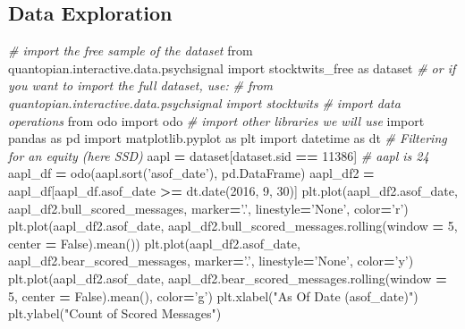 \documentclass[11,]{article}
\newenvironment{Shaded}{\begin{snugshade}}{\end{snugshade}}
\newcommand{\CommentTok}[1]{\textcolor[rgb]{0.56,0.35,0.01}{\textit{#1}}}
\newcommand{\DecValTok}[1]{\textcolor[rgb]{0.00,0.00,0.81}{#1}}
\newcommand{\ImportTok}[1]{#1}
\newcommand{\NormalTok}[1]{#1}
\newcommand{\OperatorTok}[1]{\textcolor[rgb]{0.81,0.36,0.00}{\textbf{#1}}}
\newcommand{\StringTok}[1]{\textcolor[rgb]{0.31,0.60,0.02}{#1}}
\newcommand{\VariableTok}[1]{\textcolor[rgb]{0.00,0.00,0.00}{#1}}
\begin{document}
\hypertarget{data-exploration}{%
\subsection{Data Exploration}\label{data-exploration}}

\begin{Shaded}
\begin{Highlighting}[]
\CommentTok{# import the free sample of the dataset}
\ImportTok{from}\NormalTok{ quantopian.interactive.data.psychsignal }\ImportTok{import}\NormalTok{ stocktwits_free  }\ImportTok{as}\NormalTok{ dataset}
\CommentTok{# or if you want to import the full dataset, use:}
\CommentTok{# from quantopian.interactive.data.psychsignal import stocktwits}
\CommentTok{# import data operations}
\ImportTok{from}\NormalTok{ odo }\ImportTok{import}\NormalTok{ odo}
\CommentTok{# import other libraries we will use}
\ImportTok{import}\NormalTok{ pandas }\ImportTok{as}\NormalTok{ pd}
\ImportTok{import}\NormalTok{ matplotlib.pyplot }\ImportTok{as}\NormalTok{ plt}
\ImportTok{import}\NormalTok{ datetime }\ImportTok{as}\NormalTok{ dt}
\CommentTok{# Filtering for an equity (here SSD)}
\NormalTok{aapl }\OperatorTok{=}\NormalTok{ dataset[dataset.sid }\OperatorTok{==} \DecValTok{11386}\NormalTok{] }\CommentTok{# aapl is 24}
\NormalTok{aapl_df }\OperatorTok{=}\NormalTok{ odo(aapl.sort(}\StringTok{'asof_date'}\NormalTok{), pd.DataFrame)}
\NormalTok{aapl_df2 }\OperatorTok{=}\NormalTok{ aapl_df[aapl_df.asof_date }\OperatorTok{>=}\NormalTok{ dt.date(}\DecValTok{2016}\NormalTok{, }\DecValTok{9}\NormalTok{, }\DecValTok{30}\NormalTok{)]}
\NormalTok{plt.plot(aapl_df2.asof_date, aapl_df2.bull_scored_messages, marker}\OperatorTok{=}\StringTok{'.'}\NormalTok{, linestyle}\OperatorTok{=}\StringTok{'None'}\NormalTok{, color}\OperatorTok{=}\StringTok{'r'}\NormalTok{)}
\NormalTok{plt.plot(aapl_df2.asof_date, aapl_df2.bull_scored_messages.rolling(window }\OperatorTok{=} \DecValTok{5}\NormalTok{, center }\OperatorTok{=} \VariableTok{False}\NormalTok{).mean())}
\NormalTok{plt.plot(aapl_df2.asof_date, aapl_df2.bear_scored_messages, marker}\OperatorTok{=}\StringTok{'.'}\NormalTok{, linestyle}\OperatorTok{=}\StringTok{'None'}\NormalTok{, color}\OperatorTok{=}\StringTok{'y'}\NormalTok{)}
\NormalTok{plt.plot(aapl_df2.asof_date, aapl_df2.bear_scored_messages.rolling(window }\OperatorTok{=} \DecValTok{5}\NormalTok{, center }\OperatorTok{=} \VariableTok{False}\NormalTok{).mean(), color}\OperatorTok{=}\StringTok{'g'}\NormalTok{)}
\NormalTok{plt.xlabel(}\StringTok{"As Of Date (asof_date)"}\NormalTok{)}
\NormalTok{plt.ylabel(}\StringTok{"Count of Scored Messages"}\NormalTok{)}

\end{Highlighting}
\end{Shaded}
\end{document}
